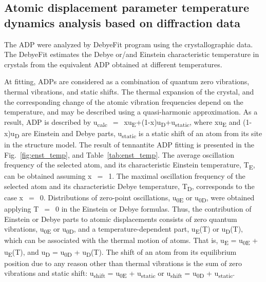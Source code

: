 \documentclass[preprint,review,12pt]{elsarticle}
\begin{document}
\subsection{Atomic displacement parameter temperature dynamics analysis based on diffraction data}\label{sec:level2}

The ADP were analyzed by DebyeFit program using the crystallographic data.
The DebyeFit estimates the Debye or/and Einstein characteristic temperature in crystals from the equivalent ADP obtained at different temperatures.

At fitting, ADPs are considered as a combination of quantum zero vibrations, thermal vibrations, and static shifts\cite{Trueblood1996,Bentien2005,Nakatsuka2011}.
The thermal expansion of the crystal, and the corresponding change of the atomic vibration frequencies depend on the temperature, and may be described using a quasi-harmonic approximation\cite{willis1975thermal,Bentien2005}.
As a result, ADP is described by u\textsubscript{calc}~$=$~xu\textsubscript{E}+(1-x)u\textsubscript{D}+u\textsubscript{static}, where xu\textsubscript{E} and (1-x)u\textsubscript{D} are Einstein and Debye parts, u\textsubscript{static} is a static shift of an atom from its site in the structure model\cite{Dudka2019}.
The result of tennantite ADP fitting is presented in the Fig.~\ref{fig:enst_temp}, and Table~\ref{tab:enst_temp}.
The average oscillation frequency of the selected atom, and its characteristic Einstein temperature, T\textsubscript{E}, can be obtained  assuming x~$=$~1.
The maximal oscillation frequency of the selected atom and its characteristic Debye temperature, T\textsubscript{D}, corresponds to the case x~$=$~0.
Distributions of zero-point oscillations, u\textsubscript{0E} or u\textsubscript{0D}, were obtained applying T~$=$~0 in the Einstein or Debye formulas.
Thus, the contribution of Einstein or Debye parts to atomic displacements consists of zero quantum vibrations, u\textsubscript{0E} or u\textsubscript{0D}, and a temperature-dependent part, u\textsubscript{E}(T) or u\textsubscript{D}(T), which can be associated with the thermal motion of atoms.
That is, u\textsubscript{E} = u\textsubscript{0E} + u\textsubscript{E}(T), and u\textsubscript{D} = u\textsubscript{0D} + u\textsubscript{D}(T). The shift of an atom from its equilibrium position due to any reason other than thermal vibrations is the sum of zero vibrations and static shift: u\textsubscript{shift} = u\textsubscript{0E} + u\textsubscript{static} or u\textsubscript{shift} = u\textsubscript{0D} + u\textsubscript{static}\cite{Dudka2019}.
\end{document}
